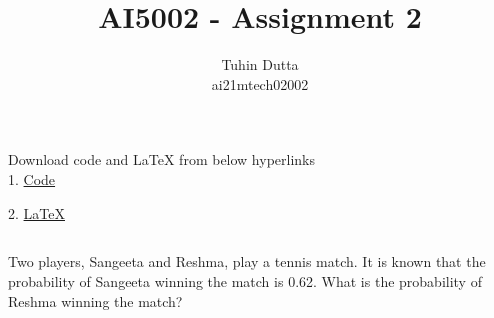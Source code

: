 \documentclass[journal,12pt,twocolumn]{IEEEtran}
\begin{document}
\providecommand{\mtx}[1]{\mathbf{#1}}
\providecommand{\fourier}{\overset{\mathcal{F}}{ \rightleftharpoons}}
\providecommand{\system}{\overset{\mathcal{H}}{ \longleftrightarrow}}
\newcommand{\solution}{\noindent \textbf{Solution: }}
\newcommand{\cosec}{\,\text{cosec}\,}
\providecommand{\dec}[2]{\ensuremath{\overset{#1}{\underset{#2}{\gtrless}}}}
\newcommand{\myvec}[1]{\ensuremath{\begin{pmatrix}#1\end{pmatrix}}}
\newcommand{\mydet}[1]{\ensuremath{\begin{vmatrix}#1\end{vmatrix}}}
\makeatletter
{}
\makeatother
\let\StandardTheFigure\thefigure
\let\vec\mathbf
\renewcommand{\thefigure}{\theproblem}
\def\putbox#1#2#3{\makebox[0in][l]{\makebox[#1][l]{}\raisebox{\baselineskip}[0in][0in]{\raisebox{#2}[0in][0in]{#3}}}}
     \def\rightbox#1{\makebox[0in][r]{#1}}
     \def\centbox#1{\makebox[0in]{#1}}
     \def\topbox#1{\raisebox{-\baselineskip}[0in][0in]{#1}}
     \def\midbox#1{\raisebox{-0.5\baselineskip}[0in][0in]{#1}}
\vspace{3cm}
\title{AI5002 - Assignment 2}
\author{Tuhin Dutta\\ ai21mtech02002}
\maketitle
\newpage
\bigskip
\renewcommand{\thefigure}{\theenumi}
\renewcommand{\thetable}{\theenumi}
\begin{mdframed}
Download code and LaTeX from below hyperlinks\\
1. \href{https://github.com/Tauhait/AI5002/Assignment-2/Codes}{Code}


2. \href{https://github.com/Tauhait/AI5002/Assignment-2/LaTeX}{LaTeX}
\end{mdframed}
\subsection*{}
Two players, Sangeeta and Reshma, play a tennis match. It is known that the probability of Sangeeta winning the match is 0.62. What is the probability of Reshma winning the match?
\subsection*{}\\
\end{document}
